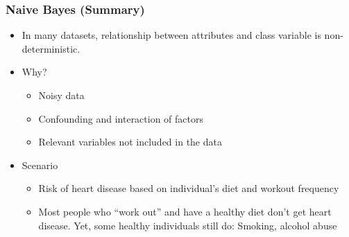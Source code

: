 \begin{frame}[fragile]\frametitle{Naive Bayes (Summary)}
\begin{itemize}
\item In many datasets, relationship between attributes and class variable is non-deterministic.
\item Why?
	\begin{itemize}
	\item Noisy data
	\item Confounding and interaction of factors
	\item Relevant variables not included in the data
	\end{itemize}

\item Scenario
	\begin{itemize}
	\item Risk of heart disease based on individual's diet and workout frequency
	\item Most people who ``work out'' and have a healthy diet don't get heart disease. Yet, some healthy individuals still do: Smoking, alcohol abuse
	\end{itemize}
\end{itemize}
\end{frame}